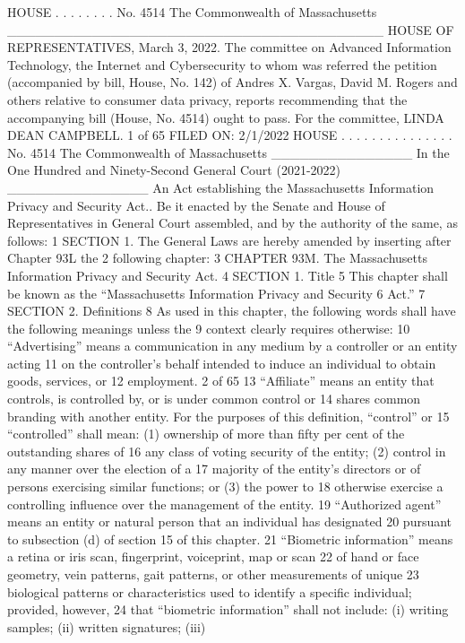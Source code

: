 HOUSE . . . . . . . . No. 4514
The Commonwealth of Massachusetts
________________________________________
HOUSE OF REPRESENTATIVES, March 3, 2022.
The committee on Advanced Information Technology, the Internet and
Cybersecurity to whom was referred the petition (accompanied by bill,
House, No. 142) of Andres X. Vargas, David M. Rogers and others
relative to consumer data privacy, reports recommending that the
accompanying bill (House, No. 4514) ought to pass.
For the committee,
LINDA DEAN CAMPBELL.
1 of 65
 FILED ON: 2/1/2022
HOUSE . . . . . . . . . . . . . . . No. 4514
The Commonwealth of Massachusetts
_______________
In the One Hundred and Ninety-Second General Court
(2021-2022)
_______________
An Act establishing the Massachusetts Information Privacy and Security Act..
Be it enacted by the Senate and House of Representatives in General Court assembled, and by the authority
of the same, as follows:
1 SECTION 1. The General Laws are hereby amended by inserting after Chapter 93L the
2 following chapter:
3 CHAPTER 93M. The Massachusetts Information Privacy and Security Act.
4 SECTION 1. Title
5 This chapter shall be known as the “Massachusetts Information Privacy and Security
6 Act.”
7 SECTION 2. Definitions
8 As used in this chapter, the following words shall have the following meanings unless the
9 context clearly requires otherwise:
10 “Advertising” means a communication in any medium by a controller or an entity acting
11 on the controller’s behalf intended to induce an individual to obtain goods, services, or
12 employment.
2 of 65
13 “Affiliate” means an entity that controls, is controlled by, or is under common control or
14 shares common branding with another entity. For the purposes of this definition, “control” or
15 “controlled” shall mean: (1) ownership of more than fifty per cent of the outstanding shares of
16 any class of voting security of the entity; (2) control in any manner over the election of a
17 majority of the entity’s directors or of persons exercising similar functions; or (3) the power to
18 otherwise exercise a controlling influence over the management of the entity.
19 “Authorized agent” means an entity or natural person that an individual has designated
20 pursuant to subsection (d) of section 15 of this chapter.
21 “Biometric information” means a retina or iris scan, fingerprint, voiceprint, map or scan
22 of hand or face geometry, vein patterns, gait patterns, or other measurements of unique
23 biological patterns or characteristics used to identify a specific individual; provided, however,
24 that “biometric information” shall not include: (i) writing samples; (ii) written signatures; (iii)
